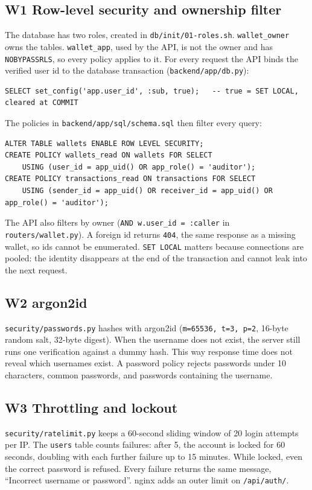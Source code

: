 \documentclass[11pt,a4paper]{article}
\newcommand{\code}[1]{\texttt{#1}}
\begin{document}
\subsection*{W1 Row-level security and ownership filter}
The database has two roles, created in \code{db/init/01-roles.sh}. \code{wallet\_owner} owns the tables. \code{wallet\_app}, used by the API, is not the owner and has \code{NOBYPASSRLS}, so every policy applies to it. For every request the API binds the verified user id to the database transaction (\code{backend/app/db.py}):
\begin{lstlisting}
SELECT set_config('app.user_id', :sub, true);   -- true = SET LOCAL, cleared at COMMIT
\end{lstlisting}
The policies in \code{backend/app/sql/schema.sql} then filter every query:
\begin{lstlisting}
ALTER TABLE wallets ENABLE ROW LEVEL SECURITY;
CREATE POLICY wallets_read ON wallets FOR SELECT
    USING (user_id = app_uid() OR app_role() = 'auditor');
CREATE POLICY transactions_read ON transactions FOR SELECT
    USING (sender_id = app_uid() OR receiver_id = app_uid() OR app_role() = 'auditor');
\end{lstlisting}
The API also filters by owner (\code{AND w.user\_id = :caller} in \code{routers/wallet.py}). A foreign id returns \code{404}, the same response as a missing wallet, so ids cannot be enumerated. \code{SET LOCAL} matters because connections are pooled: the identity disappears at the end of the transaction and cannot leak into the next request.

\subsection*{W2 argon2id}
\code{security/passwords.py} hashes with argon2id (\code{m=65536, t=3, p=2}, 16-byte random salt, 32-byte digest). When the username does not exist, the server still runs one verification against a dummy hash. This way response time does not reveal which usernames exist. A password policy rejects passwords under 10 characters, common passwords, and passwords containing the username.

\subsection*{W3 Throttling and lockout}
\code{security/ratelimit.py} keeps a 60-second sliding window of 20 login attempts per IP. The \code{users} table counts failures: after 5, the account is locked for 60 seconds, doubling with each further failure up to 15 minutes. While locked, even the correct password is refused. Every failure returns the same message, ``Incorrect username or password''. nginx adds an outer limit on \code{/api/auth/}.
\end{document}
